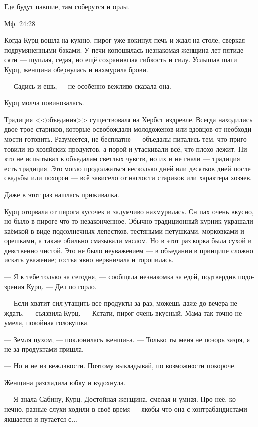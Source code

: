 \documentclass[a4paper,12pt,fleqn]{book}\usepackage{polyglossia}\setdefaultlanguage[babelshorthands=true]{russian}\setotherlanguage{english}\defaultfontfeatures{Ligatures=TeX,Mapping=tex-text}\usepackage{xcolor}\newcommand{\ml}[3]{#2}
\begin{document}
\epigraph
{
\ml{$0$}
{Где будут павшие, там соберутся и орлы.}
{Wherever the dead shall be, there the eagles shall gather.}
}{Мф. 24:28}

Когда Курц вошла на кухню, пирог уже покинул печь и ждал на столе, сверкая подрумяненными боками.
У печи копошилась незнакомая женщина лет пятидесяти --- щуплая, седая, но ещё сохранившая гибкость и силу.
Услышав шаги Курц, женщина обернулась и нахмурила брови.

--- Садись и ешь, --- не особенно вежливо сказала она.

Курц молча повиновалась.

Традиция <<объедания>> существовала на Хербст издревле.
Всегда находились двое-трое стариков, которые освобождали молодоженов или вдовцов от необходимости готовить.
Разумеется, не бесплатно --- объедалы питались тем, что приготовили из хозяйских продуктов, а порой и утаскивали всё, что плохо лежит.
Никто не испытывал к объедалам светлых чувств, но их и не гнали --- традиция есть традиция.
Это могло продолжаться несколько дней или десятков дней после свадьбы или похорон --- всё зависело от наглости стариков или характера хозяев.

Даже в этот раз нашлась приживалка.

Курц оторвала от пирога кусочек и задумчиво нахмурилась.
Он пах очень вкусно, но было в пироге что-то незаконченное.
Обычно традиционный курник украшали каёмкой в виде подсолнечных лепестков, тестяными петушками, морковками и орешками, а также обильно смазывали маслом.
Но в этот раз корка была сухой и девственно чистой.
Это не было неуважением --- в объедании в принципе сложно искать уважение;
гостья явно нервничала и торопилась.

--- Я к тебе только на сегодня, --- сообщила незнакомка за едой, подтвердив подозрения Курц.
--- Дел по горло.

--- Если хватит сил утащить все продукты за раз, можешь даже до вечера не ждать, --- съязвила Курц.
--- Кстати, пирог очень вкусный.
Мама так точно не умела, покойная головушка.

--- Земля пухом, --- поклонилась женщина.
--- Только ты меня не позорь зазря, я не за продуктами пришла.

--- Но и не из вежливости.
Поэтому выкладывай, по возможности покороче.

Женщина разгладила юбку и вздохнула.

--- Я знала Сабину, Курц.
Достойная женщина, смелая и умная.
Про неё, конечно, разные слухи ходили в своё время --- якобы что она с контрабандистами якшается и путается с...
\end{document}
